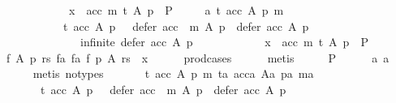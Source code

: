 \begin{isabellebody}
\ \ \ \ \ \ \ \ \ \ \ \ x\ {\isacharequal}{\kern0pt}\ {\isacharparenleft}{\kern0pt}acc{\isacharcomma}{\kern0pt}\ m{\isacharcomma}{\kern0pt}\ t{\isacharcomma}{\kern0pt}\ A{\isacharcomma}{\kern0pt}\ p{\isacharparenright}{\kern0pt}{\isasymrbrakk}\ {\isasymLongrightarrow}\ P{\isachardoublequoteclose}\ \isanewline
\ \ \ \ a{}{\isacharcolon}{\kern0pt}\ {\isachardoublequoteopen}{\isasymAnd}t\ acc\ A\ p\ m{\isachardot}{\kern0pt}\isanewline
\ \ \ \ \ \ \ \ \ \ {\isasymlbrakk}{\isasymnot}\ {\isacharparenleft}{\kern0pt}t\ {\isacharparenleft}{\kern0pt}acc\ A\ p{\isacharparenright}{\kern0pt}\ {\isasymor}\ {\isasymnot}\ defer\ {\isacharparenleft}{\kern0pt}acc\ {\isasymtriangleright}\ m{\isacharparenright}{\kern0pt}\ A\ p\ {\isasymsubset}\ defer\ acc\ A\ p\ {\isasymor}\isanewline
\ \ \ \ \ \ \ \ \ \ \ \ \ \ infinite\ {\isacharparenleft}{\kern0pt}defer\ acc\ A\ p{\isacharparenright}{\kern0pt}{\isacharparenright}{\kern0pt}{\isacharsemicolon}{\kern0pt}\isanewline
\ \ \ \ \ \ \ \ \ \ \ \ x\ {\isacharequal}{\kern0pt}\ {\isacharparenleft}{\kern0pt}acc{\isacharcomma}{\kern0pt}\ m{\isacharcomma}{\kern0pt}\ t{\isacharcomma}{\kern0pt}\ A{\isacharcomma}{\kern0pt}\ p{\isacharparenright}{\kern0pt}{\isasymrbrakk}\ {\isasymLongrightarrow}\ P{\isachardoublequoteclose}\isanewline
\ \ \isamarkupfalse%
\ {\isachardoublequoteopen}{\isasymexists}f\ A\ p\ rs\ fa{\isachardot}{\kern0pt}\ {\isacharparenleft}{\kern0pt}fa{\isacharcomma}{\kern0pt}\ f{\isacharcomma}{\kern0pt}\ p{\isacharcomma}{\kern0pt}\ A{\isacharcomma}{\kern0pt}\ rs{\isacharparenright}{\kern0pt}\ {\isacharequal}{\kern0pt}\ x{\isachardoublequoteclose}\isanewline
\ \ \ \ \isamarkupfalse%
\ prod{\isacharunderscore}{\kern0pt}cases{}\isanewline
\ \ \ \ \isamarkupfalse%
\ metis\isanewline
\ \ \isamarkupfalse%
\ \isamarkupfalse%
\ P\isanewline
\ \ \ \ \isamarkupfalse%
\ a{}\ a{}\isanewline
\ \ \ \ \isamarkupfalse%
\ {\isacharparenleft}{\kern0pt}metis\ {\isacharparenleft}{\kern0pt}no{\isacharunderscore}{\kern0pt}types{\isacharparenright}{\kern0pt}{\isacharparenright}{\kern0pt}\isanewline
{}\isamarkupfalse%
\isanewline
\ \ \isamarkupfalse%
\isanewline
\ \ \ \ {\isachardoublequoteopen}{\isasymAnd}t\ acc\ A\ p\ m\ ta\ acca\ Aa\ pa\ ma{\isachardot}{\kern0pt}\isanewline
\ \ \ \ \ \ \ t\ {\isacharparenleft}{\kern0pt}acc\ A\ p{\isacharparenright}{\kern0pt}\ {\isasymor}\ {\isasymnot}\ defer\ {\isacharparenleft}{\kern0pt}acc\ {\isasymtriangleright}\ m{\isacharparenright}{\kern0pt}\ A\ p\ {\isasymsubset}\ defer\ acc\ A\ p\ {\isasymor}\isanewline

\end{isabellebody}

